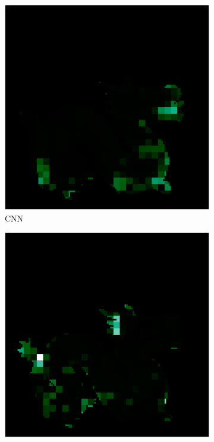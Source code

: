 \begin{figure}[H]
\begin{minipage}{0.32\linewidth}
		\begin{subfigure}[t]{0.45\linewidth}
			\includegraphics[width=\linewidth]{./Figures/feature_map_gcnn/feature_map_gcnn-cnn_11.png}
			\caption{CNN}
		\end{subfigure}
		\begin{subfigure}[t]{0.45\linewidth}
			\includegraphics[width=\linewidth]{./Figures/feature_map_gcnn/feature_map_gcnn-cnn_4.png}

\end{subfigure}
\end{minipage}
\end{figure}
